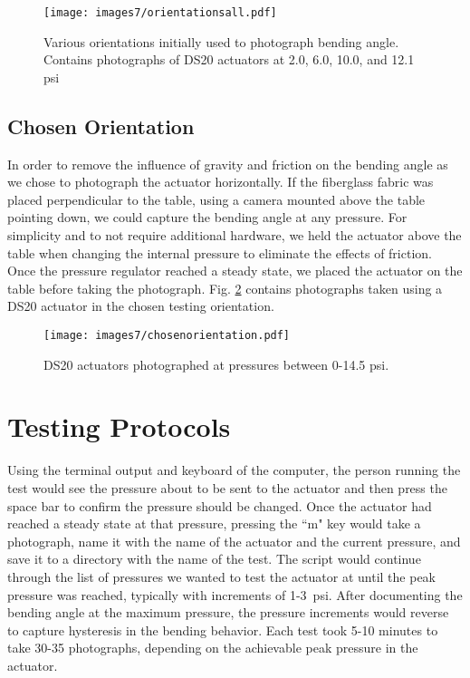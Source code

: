 \begin{figure}[!ht]
    \centering
    \texttt{[image: images7/orientationsall.pdf]}
    \caption{Various orientations initially used to photograph bending angle. Contains photographs of DS20 actuators at 2.0, 6.0, 10.0, and 12.1 psi}
    \label{fig:orientationsall}
\end{figure}

\clearpage
\subsection{Chosen Orientation}

In order to remove the influence of gravity and friction on the bending angle as we chose to photograph the actuator horizontally. If the fiberglass fabric was placed perpendicular to the table, using a camera mounted above the table pointing down, we could capture the bending angle at any pressure. For simplicity and to not require additional hardware, we held the actuator above the table when changing the internal pressure to eliminate the effects of friction. Once the pressure regulator reached a steady state, we placed the actuator on the table before taking the photograph. Fig. \ref{fig:chosenorientation} contains photographs taken using a DS20 actuator in the chosen testing orientation. 

\begin{figure}[!ht]
    \centering
    \texttt{[image: images7/chosenorientation.pdf]}
    \caption{DS20 actuators photographed at pressures between 0-14.5 psi.}
    \label{fig:chosenorientation}
\end{figure}

\clearpage
\section{Testing Protocols}

Using the terminal output and keyboard of the computer, the person running the test would see the pressure about to be sent to the actuator and then press the space bar to confirm the pressure should be changed. Once the actuator had reached a steady state at that pressure, pressing the ``m" key would take a photograph, name it with the name of the actuator and the current pressure, and save it to a directory with the name of the test. The script would continue through the list of pressures we wanted to test the actuator at until the peak pressure was reached, typically with increments of 1-3~psi. After documenting the bending angle at the maximum pressure, the pressure increments would reverse to capture hysteresis in the bending behavior. Each test took 5-10 minutes to take 30-35 photographs, depending on the achievable peak pressure in the actuator.

